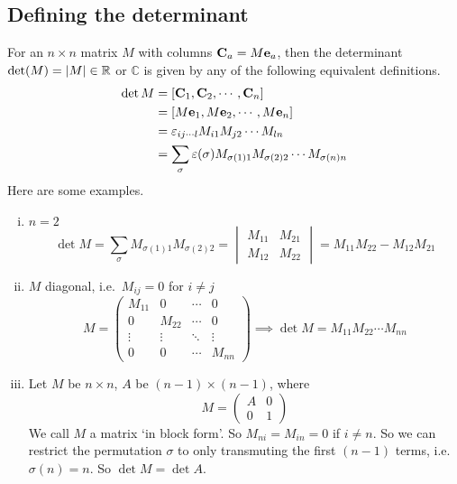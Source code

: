 \subsection{Defining the determinant}
For an \(n \times n\) matrix \(M\) with columns \(\vb C_a = M\vb e_a\), then the determinant \(\det(M) = \abs{M} \in \mathbb R\) or \(\mathbb C\) is given by any of the following equivalent definitions.
\begin{align*}
	\det M
	 & = [\vb C_1, \vb C_2, \cdots, \vb C_n]                                                \\
	 & = [M\vb e_1, M\vb e_2, \cdots, M\vb e_n]                                             \\
	 & = \varepsilon_{ij\cdots l}M_{i1}M_{j2} \cdots M_{l n}                                \\
	 & = \sum_\sigma \varepsilon(\sigma) M_{\sigma(1)1}M_{\sigma(2)2} \cdots M_{\sigma(n)n}
\end{align*}
Here are some examples.
\begin{enumerate}[(i)]
	\item \(n=2\)
	      \[
		      \det M = \sum_\sigma M_{\sigma(1)1}M_{\sigma(2)2} = \begin{vmatrix}
			      M_{11} & M_{21} \\ M_{12} & M_{22}
		      \end{vmatrix} = M_{11}M_{22} - M_{12}M_{21}
	      \]
	\item \(M\) diagonal, i.e.\ \(M_{ij} = 0\) for \(i \neq j\)
	      \[
		      M = \begin{pmatrix}
			      M_{11} & 0      & \cdots & 0      \\
			      0      & M_{22} & \cdots & 0      \\
			      \vdots & \vdots & \ddots & \vdots \\
			      0      & 0      & \cdots & M_{nn}
		      \end{pmatrix} \implies \det M = M_{11}M_{22}\cdots M_{nn}
	      \]
	\item Let \(M\) be \(n\times n\), \(A\) be \((n-1) \times (n-1)\), where
	      \[
		      M = \left( \begin{array}{c|c}
				      A & 0 \\\hline
				      0 & 1
			      \end{array} \right)
	      \]
	      We call \(M\) a matrix `in block form'.
	      So \(M_{ni} = M_{in} = 0\) if \(i \neq n\).
	      So we can restrict the permutation \(\sigma\) to only transmuting the first \((n-1)\) terms, i.e.\ \(\sigma(n) = n\).
	      So \(\det M = \det A\).
\end{enumerate}

